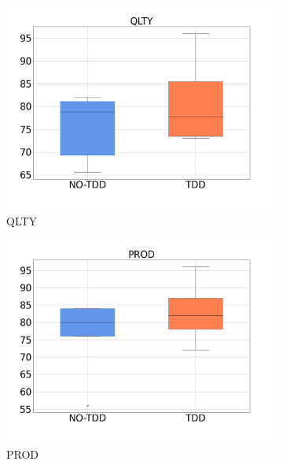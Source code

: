 \begin{figure}[H]
    \centering
    \begin{subfigure}{0.33\textwidth}
        \includegraphics[width=\linewidth]{figures/box_plots/task1/QLTY.png}
        \caption{QLTY}
        \label{bp_task1_qlty}
    \end{subfigure}\hfil
        \begin{subfigure}{0.33\textwidth}
        \includegraphics[width=\linewidth]{figures/box_plots/task1/PROD.png}
        \caption{PROD}
        \label{bp_task1_prod}
    \end{subfigure}\hfil
    \begin{subfigure}{0.33\textwidth}

\end{subfigure}
\end{figure}
